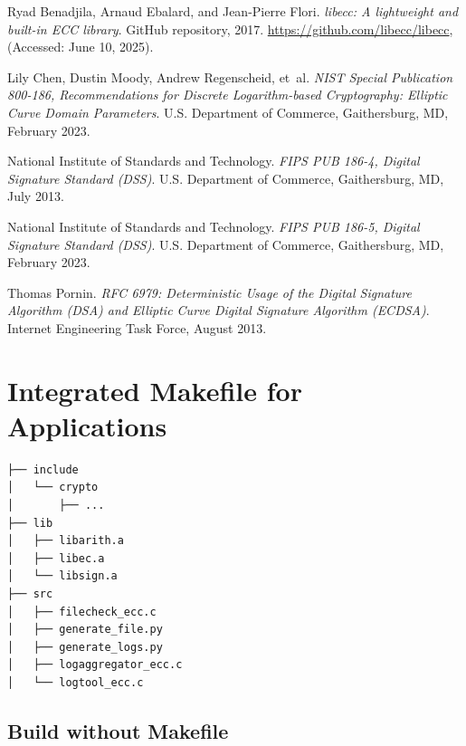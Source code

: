 \documentclass[11pt,a4paper]{report}
\theoremstyle{definitionstyle}
\begin{document}


\begin{thebibliography}{99}
	
	Ryad Benadjila, Arnaud Ebalard, and Jean-Pierre Flori.
	\newblock \emph{libecc: A lightweight and built-in ECC library}.
	\newblock GitHub repository, 2017.
	\newblock \url{https://github.com/libecc/libecc}, (Accessed: June 10, 2025).
	
	Lily Chen, Dustin Moody, Andrew Regenscheid, et~al.
	\newblock \emph{{NIST Special Publication 800-186, Recommendations for Discrete
			Logarithm-based Cryptography: Elliptic Curve Domain Parameters}}.
	\newblock U.S. Department of Commerce, Gaithersburg, MD, February 2023.
	
	National Institute of Standards and Technology.
	\newblock \emph{{FIPS PUB 186-4, Digital Signature Standard (DSS)}}.
	\newblock U.S. Department of Commerce, Gaithersburg, MD, July 2013.
	
	National Institute of Standards and Technology.
	\newblock \emph{{FIPS PUB 186-5, Digital Signature Standard (DSS)}}.
	\newblock U.S. Department of Commerce, Gaithersburg, MD, February 2023.
	
	Thomas Pornin.
	\newblock \emph{{RFC 6979: Deterministic Usage of the Digital Signature
			Algorithm (DSA) and Elliptic Curve Digital Signature Algorithm (ECDSA)}}.
	\newblock Internet Engineering Task Force, August 2013.
	
\end{thebibliography}

\appendix
\chapter{Integrated Makefile for Applications}
\begin{verbatim}
├── include
│   └── crypto
│       ├── ...
├── lib
│   ├── libarith.a
│   ├── libec.a
│   └── libsign.a
├── src
│   ├── filecheck_ecc.c
│   ├── generate_file.py
│   ├── generate_logs.py
│   ├── logaggregator_ecc.c
│   └── logtool_ecc.c
\end{verbatim}

\vfill
\section*{Build without Makefile}
\end{document}
